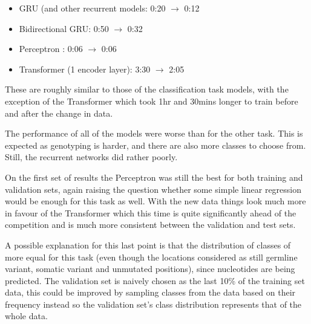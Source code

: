 \documentclass[bsc,frontabs,singlespacing,parskip,deptreport]{infthesis}
\begin{document}
\begin{itemize}

\item GRU (and other recurrent models: 0:20 $ \rightarrow $ 0:12
\item Bidirectional GRU: 0:50 $ \rightarrow $ 0:32
\item Perceptron : 0:06 $ \rightarrow $ 0:06
\item Transformer (1 encoder layer): 3:30 $ \rightarrow $ 2:05

\end{itemize}

These are roughly similar to those of the classification task models, with the exception of the Transformer which took 1hr and 30mins longer to train before and after the change in data.

The performance of all of the models were worse than for the other task. This is expected as genotyping is harder, and there are also more classes to choose from. Still, the recurrent networks did rather poorly.

On the first set of results the Perceptron was still the best for both training and validation sets, again raising the question whether some simple linear regression would be enough for this task as well. With the new data things look much more in favour of the Transformer which this time is quite significantly ahead of the competition and is much more consistent between the validation and test sets.

A possible explanation for this last point is that the distribution of classes of more equal for this task (even though the locations considered as still germline variant, somatic variant and unmutated positions), since nucleotides are being predicted. The validation set is naively chosen as the last 10\% of the training set data, this could be improved by sampling classes from the data based on their frequency instead so the validation set's class distribution represents that of the whole data.
\end{document}
